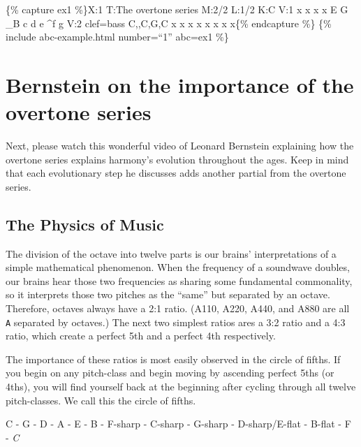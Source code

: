 \documentclass{book}
\begin{document}
\{\% capture ex1 \%\}X:1 T:The overtone series M:2/2 L:1/2 K:C V:1 x x x x E G
\_B c d e \^{}f g\textbar{]} V:2 clef=bass C,,C,G,C x x x x x x x
x\textbar{]}\{\% endcapture \%\} \{\% include abc-example.html number=``1''
abc=ex1 \%\}

\hypertarget{bernstein-on-the-importance-of-the-overtone-series}{%
\section{Bernstein on the importance of the overtone
series}\label{bernstein-on-the-importance-of-the-overtone-series}}

Next, please watch this wonderful video of Leonard Bernstein explaining how
the overtone series explains harmony's evolution throughout the ages. Keep in
mind that each evolutionary step he discusses adds another partial from the
overtone series.

\hypertarget{the-physics-of-music}{%
\subsection{The Physics of Music}\label{the-physics-of-music}}

The division of the octave into twelve parts is our brains' interpretations of
a simple mathematical phenomenon. When the frequency of a soundwave doubles,
our brains hear those two frequencies as sharing some fundamental commonality,
so it interprets those two pitches as the ``same'' but separated by an octave.
Therefore, octaves always have a 2:1 ratio. (A110, A220, A440, and A880 are
all \texttt{A} separated by octaves.) The next two simplest ratios ares a 3:2
ratio and a 4:3 ratio, which create a perfect 5th and a perfect 4th
respectively.

The importance of these ratios is most easily observed in the circle of
fifths. If you begin on any pitch-class and begin moving by ascending perfect
5ths (or 4ths), you will find yourself back at the beginning after cycling
through all twelve pitch-classes. We call this the circle of fifths.

C - G - D - A - E - B - F-sharp - C-sharp - G-sharp - D-sharp/E-flat - B-flat
- F - \emph{C}
\end{document}

